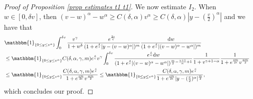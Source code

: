 \documentclass[11pt]{article}
\numberwithin{equation}{section}
\newcommand{\der}{\textup{d}}
\begin{document}
\begin{proof}[Proof of Proposition 
\ref{prop estimates t1 t1}]
  We now estimate $I_{2}$. 
   When $w\in[0,\delta v]$, then $(v-w)^{\alpha}-w^{\alpha}\geq C(\delta,\alpha) v^{\alpha}\geq C(\delta,\alpha)|y-(\frac{v}{2})^{\alpha}|$ and we  have that
  \begin{align*}
    &  \mathbbm{1}_{\{0\leq y\leq v^{\alpha}\}}\int_{0}^{\delta v}\frac{v^{\gamma}}{1+w^{b}}\frac{e^{\frac{2s}{\epsilon}}}{(1+e^{\frac{s}{\epsilon}}|y-(v-w)^{\alpha}|)^{m}}\frac{\der w}{(1+e^{\frac{s}{\epsilon}}|(v-w)^{\alpha}-w^{\alpha}|)^{m}}\\
    &  \leq  \mathbbm{1}_{\{0\leq y\leq v^{\alpha}\}}C(\delta,\alpha,\gamma,m) e^{\frac{s}{\epsilon}} v^{\gamma}\int_{0}^{\delta v}\frac{e^{\frac{s}{\epsilon}}\der w}{(1+e^{\frac{s}{\epsilon}}|(v-w)^{\alpha}-w^{\alpha}|)^{\frac{m}{2}-\frac{\gamma+1}{\alpha}+1}}\frac{1}{1+v^{\gamma+1-\alpha}}\frac{1}{1+e^{\frac{sm}{2\epsilon}}v^{\frac{\alpha m}{2}}}\\
    & \leq  \mathbbm{1}_{\{0\leq y\leq v^{\alpha}\}}\frac{C(\delta,\alpha,\gamma,m) e^{\frac{s}{\epsilon}} }{1+e^{\frac{sm}{2\epsilon}}v^{\frac{\alpha m}{2}}} \leq  \mathbbm{1}_{\{0\leq y\leq v^{\alpha}\}}\frac{C(\delta,\alpha,\gamma,m) e^{\frac{s}{\epsilon}} }{1+e^{\frac{sm}{2\epsilon}}|y-(\frac{v}{2})^{\alpha}|^{\frac{m}{2}}},
  \end{align*}
  which concludes our proof.


\end{proof}
\end{document}
